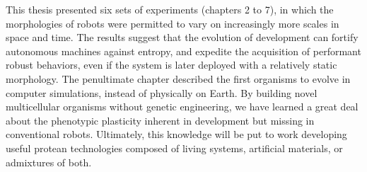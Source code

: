 This thesis presented six sets of experiments (chapters 2 to 7), in which the morphologies of robots were permitted to vary on increasingly more scales in space and time.
The results suggest that the evolution of development can 
fortify autonomous machines against entropy,
and
expedite the acquisition of performant robust behaviors,
even if the system is later deployed with a relatively static morphology.
The penultimate chapter described the first organisms to evolve in computer simulations, instead of physically on Earth.
By building novel multicellular organisms without genetic engineering, we have learned a great deal about the phenotypic plasticity inherent in development but missing in conventional robots.
Ultimately, this knowledge will be put to work developing useful protean technologies composed of living systems, artificial materials, or admixtures of both.



\nocite{kriegman2017minimal,kriegman2018morphological, kriegman2018interoceptive,kriegman2019automated,kriegman2019why, kriegman2020sim2real4designs,kriegman2020xenobots}

